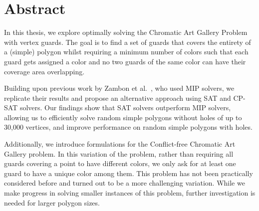 \chapter*{Abstract}
In this thesis, we explore optimally solving the Chromatic Art Gallery Problem with vertex guards. The goal is to find a set of guards that covers the entirety of a (simple) polygon whilst requiring a minimum number of colors such that each guard gets assigned a color and no two guards of the same color can have their coverage area overlapping.

Building upon previous work by Zambon et al.~\cite{zambon2014exact}, who used MIP solvers, we replicate their results and propose an alternative approach using SAT and CP-SAT solvers. Our findings show that SAT solvers outperform MIP solvers, allowing us to efficiently solve random simple polygons without holes of up to 30,000 vertices, and improve performance on random simple polygons with holes. 

Additionally, we introduce formulations for the Conflict-free Chromatic Art Gallery problem. In this variation of the problem, rather than requiring all guards covering a point to have different colors, we only ask for at least one guard to have a unique color among them. This problem has not been practically considered before and turned out to be a more challenging variation. While we make progress in solving smaller instances of this problem, further investigation is needed for larger polygon sizes.
